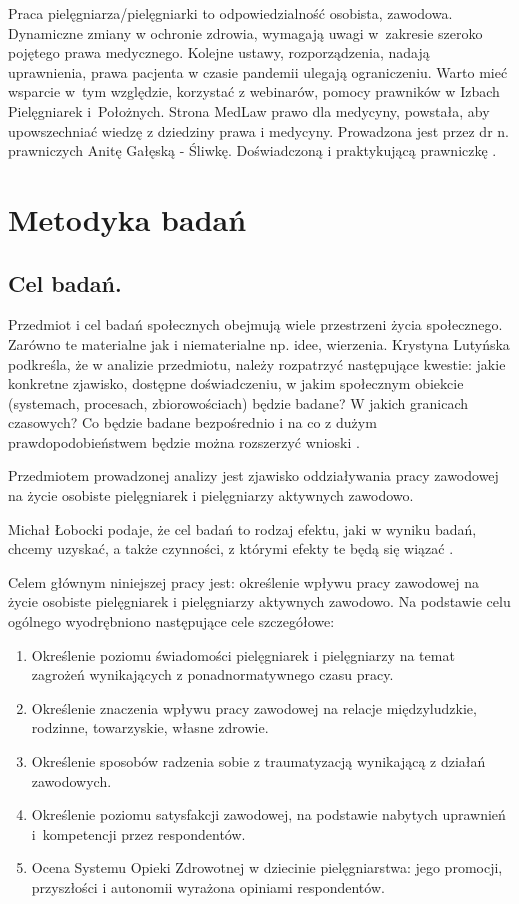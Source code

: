 \documentclass[a4paper,12pt,twoside,openright]{mwrep}
\begin{document}
Praca pielęgniarza/pielęgniarki to odpowiedzialność osobista, zawodowa. Dynamiczne zmiany w ochronie zdrowia, wymagają uwagi w~zakresie szeroko pojętego prawa medycznego. Kolejne ustawy, rozporządzenia, nadają uprawnienia, prawa pacjenta w czasie pandemii ulegają ograniczeniu. Warto mieć wsparcie w~tym względzie, korzystać z webinarów, pomocy prawników w Izbach Pielęgniarek i~Położnych. Strona MedLaw prawo dla medycyny, powstała, aby upowszechniać wiedzę z dziedziny prawa i medycyny. Prowadzona jest przez dr n. prawniczych Anitę Gałęską - Śliwkę. Doświadczoną i praktykującą prawniczkę \cite{anita}.


\chapter{Metodyka badań}

\section{Cel badań.}
Przedmiot i cel badań społecznych obejmują wiele przestrzeni życia społecznego. Zarówno te materialne jak i niematerialne np. idee, wierzenia. Krystyna Lutyńska podkreśla, że w analizie przedmiotu, należy rozpatrzyć następujące kwestie: jakie konkretne zjawisko, dostępne doświadczeniu, w jakim społecznym obiekcie (systemach, procesach, zbiorowościach) będzie badane? W jakich granicach czasowych? Co będzie badane bezpośrednio i na co z dużym prawdopodobieństwem będzie można rozszerzyć wnioski \cite{krys}.

Przedmiotem prowadzonej analizy jest zjawisko oddziaływania pracy zawodowej na życie osobiste pielęgniarek i pielęgniarzy aktywnych zawodowo.

Michał Łobocki podaje, że cel badań to rodzaj efektu, jaki w wyniku badań, chcemy uzyskać, a także czynności, z którymi efekty te będą się wiązać \cite{mich}.

Celem głównym niniejszej pracy jest: określenie wpływu pracy zawodowej na życie osobiste pielęgniarek i pielęgniarzy aktywnych zawodowo.
Na podstawie celu ogólnego wyodrębniono następujące cele szczegółowe:
\begin{enumerate}
	\item Określenie poziomu świadomości pielęgniarek i pielęgniarzy na temat zagrożeń wynikających z ponadnormatywnego czasu pracy.
	\item Określenie znaczenia wpływu pracy zawodowej na relacje międzyludzkie, rodzinne, towarzyskie, własne zdrowie.
	\item Określenie sposobów radzenia sobie z traumatyzacją wynikającą z działań zawodowych.
	\item Określenie poziomu satysfakcji zawodowej, na podstawie nabytych uprawnień i~kompetencji przez respondentów.
	\item Ocena Systemu Opieki Zdrowotnej w dziecinie pielęgniarstwa: jego promocji, przyszłości i autonomii wyrażona opiniami respondentów.
\end{enumerate}
\end{document}
